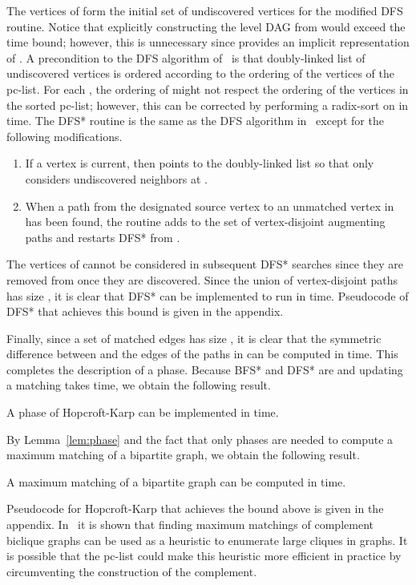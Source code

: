 \documentclass{llncs}
\begin{document}
The vertices of  form the initial set of undiscovered vertices for the modified DFS routine.  Notice that explicitly constructing the level DAG  from  would exceed the  time bound; however, this is unnecessary since  provides an implicit representation of .
A precondition to the DFS algorithm of~\cite{LindzeyO13} is that doubly-linked list of undiscovered vertices is ordered according to the ordering of the vertices of the pc-list. For each , the ordering of  might not respect the ordering of the vertices in the sorted pc-list; however, this can be corrected by performing a radix-sort on  in  time.  The DFS* routine is the same as the DFS algorithm in~\cite{LindzeyO13} except for the following modifications.

\begin{enumerate}
\item If a vertex  is current, then  points to the doubly-linked list  so that  only considers undiscovered neighbors at .
\item When a path  from the designated source vertex  to an unmatched vertex in  has been found, the routine adds  to the set of vertex-disjoint augmenting paths and restarts DFS* from .
\end{enumerate}
The vertices of  cannot be considered in subsequent DFS* searches since they are removed from  once they are discovered.   Since the union of vertex-disjoint paths  has size , it is clear that DFS* can be implemented to run in  time.   Pseudocode of DFS* that achieves this bound is given in the appendix.

Finally, since a set of matched edges  has size , it is clear that the symmetric difference between  and the edges of the paths in  can be computed in  time.  This completes the description of a phase.  Because BFS* and DFS* are  and updating a matching takes  time, we obtain the following result.

\begin{lemma}\label{lem:phase}
A phase of Hopcroft-Karp can be implemented in  time.
\end{lemma}

\noindent By Lemma~\ref{lem:phase} and the fact that only  phases are needed to compute a maximum matching of a bipartite graph,  we obtain the following result.
\begin{theorem}
A maximum matching of a bipartite graph  can be computed in  time.
\end{theorem}


\noindent Pseudocode for Hopcroft-Karp that achieves the bound above is given in the appendix.  In~\cite{BalasN93} it is shown that finding maximum matchings of complement biclique graphs can be used as a heuristic to enumerate large cliques in graphs.  It is possible that the pc-list could make this heuristic more efficient in practice by circumventing the construction of the complement.
\end{document}
